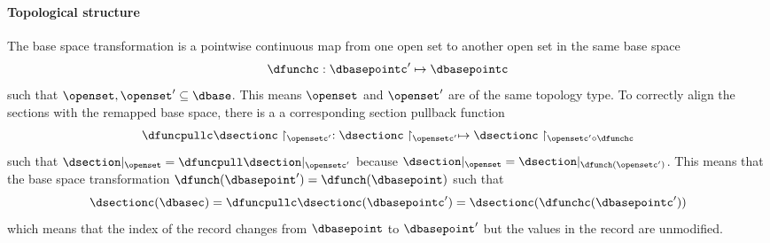 \documentclass[10pt,journal,compsoc]{IEEEtran}
\theoremstyle{definition}
\theoremstyle{remark}
\begin{document}
\paragraph{\textbf{Topological structure}}
\noindent
The base space transformation is a pointwise continuous map from one open set to another open set in the same base space
\begin{equation}
  \label{eq:atct:morphism:base}
 \dfunchc: \dbasepointc^{\prime}\mapsto \dbasepointc
 \end{equation}
such that $\openset, \openset^{\prime} \subseteq \dbase$. This means $\openset$ and $\openset^{\prime}$ are of the same topology type. To correctly align the sections with the remapped base space, there is a a corresponding section pullback function
\begin{equation}
  \label{eq:atct:morphism:basepull}
  \dfuncpullc \dsectionc \restriction_{\opensetc^{\prime}}: \dsectionc\restriction_{\opensetc^{\prime}} \mapsto \dsectionc \restriction_{\opensetc^{\prime} \circ \dfunchc} 
\end{equation}
such that $\dsection|_{\openset} = \dfuncpull\dsection|_{\opensetc^{\prime}}$ because $\dsection|_{\openset} = \dsection|_{\dfunch(\opensetc^{\prime})}$. This means that the base space transformation  $\dfunch(\dbasepoint^{\prime}) = \dfunch(\dbasepoint)$ such that  
\begin{equation}
  \label{eq:atct:morphism:verify_base}
  \dsectionc(\dbasec) = \dfuncpullc\dsectionc(\dbasepointc^{\prime}) = \dsectionc(\dfunchc(\dbasepointc^{\prime}))
\end{equation} 
which means that the index of the record changes from $\dbasepoint$ to $\dbasepoint^{\prime}$ but the values in the record are unmodified.
\end{document}
